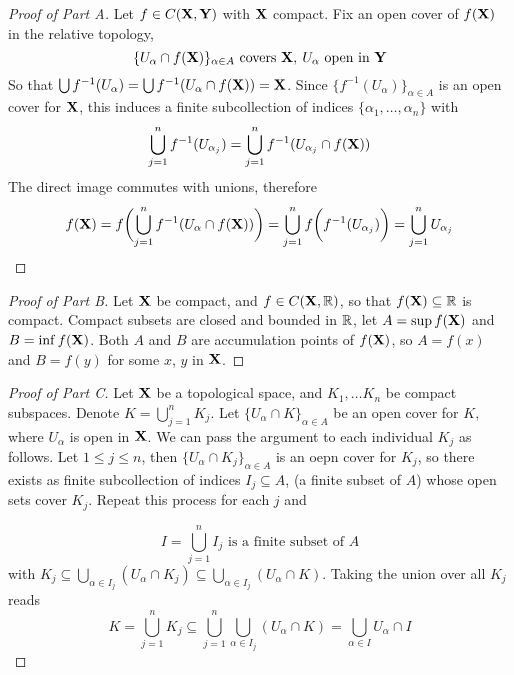\documentclass[../../main.tex]{subfiles}
\begin{document}
\newpage
\begin{proof}[Proof of  Part A]
    Let $f\in C({\mathbf{X}},{\mathbf{Y}})$ with ${\mathbf{X}}$ compact. Fix an open cover of $f({\mathbf{X}})$ in the relative topology, 
    \[
        \{U_\alpha\cap f({\mathbf{X}})\}_{\alpha\in A}\text{ covers }{\mathbf{X}},\: U_\alpha\text{ open in }{\mathbf{Y}}
    \]    
    So that $\bigcup f^{-1}(U_\alpha) = \bigcup f^{-1}(U_\alpha\cap f({\mathbf{X}}))={\mathbf{X}}$. Since $\{f^{-1}(U_\alpha)\}_{\alpha\in A}$ is an open cover for ${\mathbf{X}}$, this induces a finite subcollection of indices $\{\alpha_1,\ldots,\alpha_n\}$ with
    \[
        \bigcup_{j=1}^nf^{-1}(U_{\alpha_j}) = \bigcup_{j=1}^nf^{-1}(U_{\alpha_j}\cap f({\mathbf{X}}))
    \]
    The direct image commutes with unions, therefore
    \[
        f({\mathbf{X}})=f\biggl(\bigcup_{j=1}^nf^{-1}(U_\alpha\cap f({\mathbf{X}}))\biggr) = \bigcup_{j=1}^nf\biggl(f^{-1}(U_{\alpha_j})\biggr) = \bigcup_{j=1}^n U_{\alpha_j}
    \]
\end{proof}


\begin{proof}[Proof of  Part B]
    Let ${\mathbf{X}}$ be compact, and $f\in C({\mathbf{X}},\mathbb{R})$, so that $f({\mathbf{X}})\subseteq\mathbb{R}$ is compact. Compact subsets are closed and bounded in $\mathbb{R}$, let $A = \sup f({\mathbf{X}})$ and $B = \inf f({\mathbf{X}})$. Both $A$ and $B$ are accumulation points of $f({\mathbf{X}})$, so $A = f(x)$ and $B = f(y)$ for some $x$, $y$ in ${\mathbf{X}}$.
\end{proof}


\begin{proof}[Proof of  Part C]
    Let ${\mathbf{X}}$ be a topological space, and $K_1,\ldots K_n$ be compact subspaces. Denote $K = \bigcup_{j=1}^n K_j$. Let $\{U_\alpha\cap K\}_{\alpha\in A}$ be an open cover for $K$, where $U_\alpha$ is open in ${\mathbf{X}}$. We can pass the argument to each individual $K_j$ as follows. Let $1\leq j\leq n$, then $\{U_\alpha\cap K_j\}_{\alpha\in A}$ is an oepn cover for $K_j$, so there exists as finite subcollection of indices $I_j\subseteq A$, (a finite subset of $A$) whose open sets cover $K_j$. Repeat this process for each $j$ and 

    \[
        I = \bigcup_{j=1}^n I_j \text{ is a finite subset of } A
    \]
    with $K_j\subseteq \bigcup_{\alpha\in I_j}(U_\alpha\cap K_j)\subseteq \bigcup_{\alpha\in I_j}(U_\alpha\cap K)$. Taking the union over all $K_j$ reads
    \[
        K = \bigcup_{j=1}^n K_j\subseteq \bigcup_{j=1}^n \bigcup_{\alpha\in I_j}(U_\alpha\cap K)=\bigcup_{\alpha\in I}U_\alpha\cap I
    \]
\end{proof}
\end{document}
